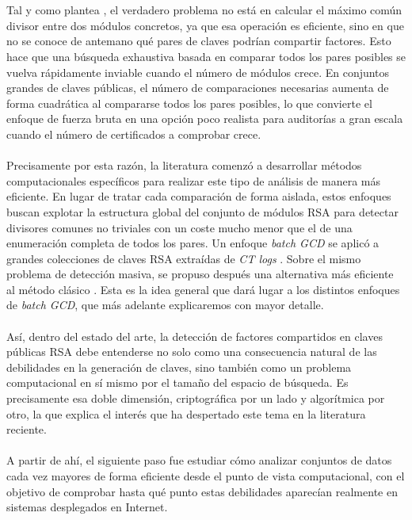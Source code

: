 \\
\\
Tal y como plantea \citet{pelofske2024efficient}, el verdadero problema no está en calcular el máximo común divisor entre dos módulos concretos, ya que esa operación es eficiente, sino en que no se conoce de antemano qué pares de claves podrían compartir factores. Esto hace que una búsqueda exhaustiva basada en comparar todos los pares posibles se vuelva rápidamente inviable cuando el número de módulos crece. En conjuntos grandes de claves públicas, el número de comparaciones necesarias aumenta de forma cuadrática al compararse todos los pares posibles, lo que convierte el enfoque de fuerza bruta en una opción poco realista para auditorías a gran escala cuando el número de certificados a comprobar crece.
\\
\\
Precisamente por esta razón, la literatura comenzó a desarrollar métodos computacionales específicos para realizar este tipo de análisis de manera más eficiente. En lugar de tratar cada comparación de forma aislada, estos enfoques buscan explotar la estructura global del conjunto de módulos RSA para detectar divisores comunes no triviales con un coste mucho menor que el de una enumeración completa de todos los pares. Un enfoque \textit{batch GCD} se aplicó a grandes colecciones de claves RSA extraídas de \textit{CT logs} \citep{vage2022finding}. Sobre el mismo problema de detección masiva, se propuso después una alternativa más eficiente al método clásico \citep{pelofske2024efficient}. Esta es la idea general que dará lugar a los distintos enfoques de \textit{batch GCD}, que más adelante explicaremos con mayor detalle.
\\
\\
Así, dentro del estado del arte, la detección de factores compartidos en claves públicas RSA debe entenderse no solo como una consecuencia natural de las debilidades en la generación de claves, sino también como un problema computacional en sí mismo por el tamaño del espacio de búsqueda. Es precisamente esa doble dimensión, criptográfica por un lado y algorítmica por otro, la que explica el interés que ha despertado este tema en la literatura reciente.
\\
\\
A partir de ahí, el siguiente paso fue estudiar cómo analizar conjuntos de datos cada vez mayores de forma eficiente desde el punto de vista computacional, con el objetivo de comprobar hasta qué punto estas debilidades aparecían realmente en sistemas desplegados en Internet.

